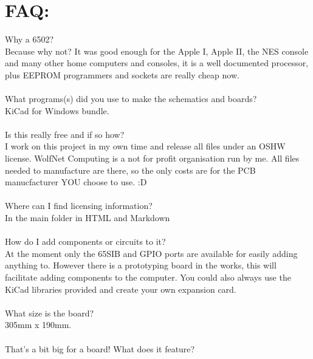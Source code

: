\documentclass[11pt]{book} %
\begin{document}
\section{FAQ:}
Why a 6502?\\
Because why not? It was good enough for the Apple I, Apple II, the NES console and many other home computers and consoles, it is a well documented processor, plus EEPROM programmers and sockets are really cheap now.\\
\\
What programs(s) did you use to make the schematics and boards?\\
KiCad for Windows bundle.\\
\\
Is this really free and if so how?\\
I work on this project in my own time and release all files under an OSHW license. WolfNet Computing is a not for profit organisation run by me. All files needed to manufacture are there, so the only costs are for the PCB manucfacturer YOU choose to use. :D\\
\\
Where can I find licensing information?\\
In the main folder in HTML and Markdown\\
\\
How do I add components or circuits to it?\\
At the moment only the 65SIB and GPIO ports are available for easily adding anything to. However there is a prototyping board in the works, this will facilitate adding components to the computer. You could also always use the KiCad libraries provided and create your own expansion card.\\
\\
What size is the board?\\
305mm x 190mm.\\
\\
That's a bit big for a board! What does it feature?\\
\\
\\
\\
\\
\\
\\
\\
\\
\\
\\
\\
\\
\end{document}
